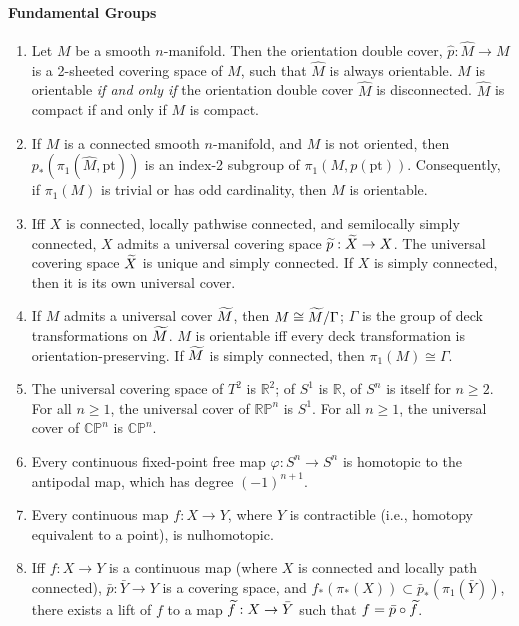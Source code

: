 \documentclass{article}
\begin{document}
	\paragraph{Fundamental Groups}
	\begin{enumerate}[start=18]
		\item Let $M$ be a smooth $n$-manifold. Then the orientation double cover, $\hat{p}: \hat{M} \to M$ is a 2-sheeted covering space of $M$, such that $\hat{M}$ is always orientable. $M$ is orientable \textit{if and only if} the orientation double cover $\hat{M}$ is disconnected. $\hat{M}$ is compact if and only if $M$ is compact.
		\item If $M$ is a connected smooth $n$-manifold, and $M$ is not oriented, then $p_{\ast}(\pi_{1}(\hat{M}, \text{pt}))$ is an index-2 subgroup of $\pi_1(M, p(\text{pt}))$. Consequently, if $\pi_{1}(M)$ is trivial or has odd cardinality, then $M$ is orientable. 
		\item Iff $X$ is connected, locally pathwise connected, and semilocally simply connected, $X$ admits a universal covering space $\widetilde{p}: \widetilde{X} \to X$. The universal covering space $\widetilde{X}$ is unique and simply connected. If $X$ is simply connected, then it is its own universal cover. 
		\item If $M$ admits a universal cover $\widetilde{M}$, then $M \cong \widetilde{M}/\Gamma$; $\Gamma$ is the group of deck transformations on $\widetilde{M}$. $M$ is orientable iff every deck transformation is orientation-preserving. If $\widetilde{M}$ is simply connected, then $\pi_{1}(M) \cong \Gamma$. 
		\item The universal covering space of $T^{2}$ is $\mathbb{R}^2$; of $S^1$ is $\mathbb{R}$, of $S^{n}$ is itself for $n \geq 2$. For all $n\geq 1$, the universal cover of $\mathbb{RP}^n$ is $S^1$. For all $n \geq 1$, the universal cover of $\mathbb{CP}^{n}$ is $\mathbb{CP}^{n}$. 
		\item Every continuous fixed-point free map $\varphi: S^{n} \to S^{n}$ is homotopic to the antipodal map, which has degree $(-1)^{n + 1}$. 
		\item Every continuous map $f: X \to Y$, where $Y$ is contractible (i.e., homotopy equivalent to a point), is nulhomotopic. 
		\item Iff $f: X \to Y$ is a continuous map (where $X$ is connected and locally path connected), $\bar{p}: \bar{Y} \to Y$ is a covering space, and $f_{\ast}(\pi_\ast(X)) \subset\bar{p}_\ast(\pi_{1}(\bar{Y}))$, there exists a lift of $f$ to a map $\widetilde{f}: X \to \bar{Y}$ such that $f = \bar{p} \circ \widetilde{f}$. 

\end{enumerate}
\end{document}
